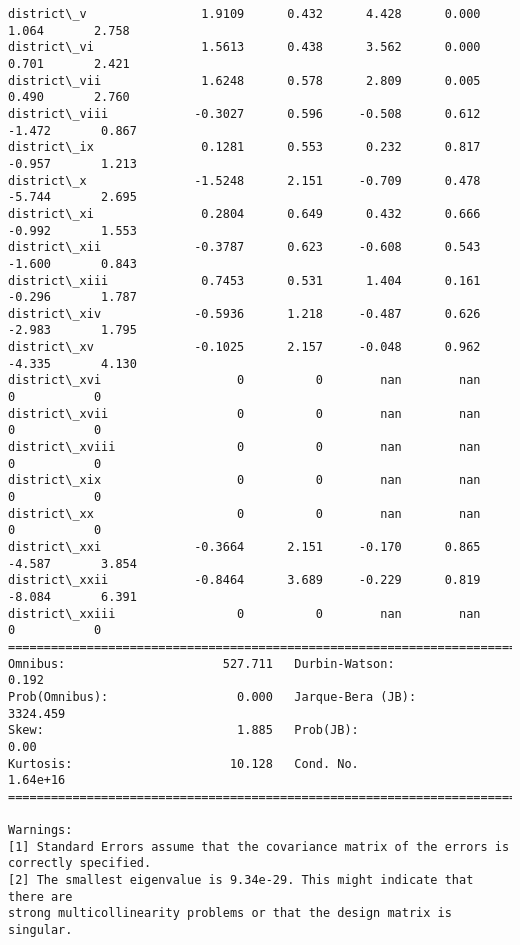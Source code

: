 \documentclass[11pt]{article}
\begin{document}
\begin{Verbatim}[commandchars=\\\{\}]
district\_v                1.9109      0.432      4.428      0.000       1.064       2.758
district\_vi               1.5613      0.438      3.562      0.000       0.701       2.421
district\_vii              1.6248      0.578      2.809      0.005       0.490       2.760
district\_viii            -0.3027      0.596     -0.508      0.612      -1.472       0.867
district\_ix               0.1281      0.553      0.232      0.817      -0.957       1.213
district\_x               -1.5248      2.151     -0.709      0.478      -5.744       2.695
district\_xi               0.2804      0.649      0.432      0.666      -0.992       1.553
district\_xii             -0.3787      0.623     -0.608      0.543      -1.600       0.843
district\_xiii             0.7453      0.531      1.404      0.161      -0.296       1.787
district\_xiv             -0.5936      1.218     -0.487      0.626      -2.983       1.795
district\_xv              -0.1025      2.157     -0.048      0.962      -4.335       4.130
district\_xvi                   0          0        nan        nan           0           0
district\_xvii                  0          0        nan        nan           0           0
district\_xviii                 0          0        nan        nan           0           0
district\_xix                   0          0        nan        nan           0           0
district\_xx                    0          0        nan        nan           0           0
district\_xxi             -0.3664      2.151     -0.170      0.865      -4.587       3.854
district\_xxii            -0.8464      3.689     -0.229      0.819      -8.084       6.391
district\_xxiii                 0          0        nan        nan           0           0
==============================================================================
Omnibus:                      527.711   Durbin-Watson:                   0.192
Prob(Omnibus):                  0.000   Jarque-Bera (JB):             3324.459
Skew:                           1.885   Prob(JB):                         0.00
Kurtosis:                      10.128   Cond. No.                     1.64e+16
==============================================================================

Warnings:
[1] Standard Errors assume that the covariance matrix of the errors is correctly specified.
[2] The smallest eigenvalue is 9.34e-29. This might indicate that there are
strong multicollinearity problems or that the design matrix is singular.

    \end{Verbatim}
\end{document}
